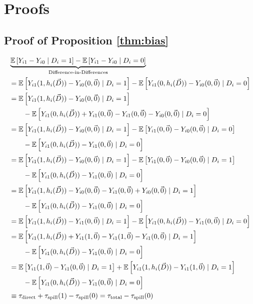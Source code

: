 \documentclass[11pt]{article}
\begin{document}
\section{Proofs}
\label{sec:proofs}

\subsection{Proof of Proposition \ref{thm:bias}}

\begin{align*}
    &\underbrace{\mathbb{E}\left[Y_{i1} - Y_{i0} \mid D_i = 1 \right] - \mathbb{E}\left[Y_{i1} - Y_{i0} \mid D_i = 0 \right]}_{\text{Difference-in-Differences}} \\
    &= \mathbb{E}\left[Y_{i1}(1, h_i(\vec{D})) - Y_{i0}(0, \vec{0})  \mid D_i = 1 \right] - \mathbb{E}\left[Y_{i1}(0, h_i(\vec{D})) - Y_{i0}(0, \vec{0}) \mid D_i = 0 \right] \\
    &= \mathbb{E}\left[Y_{i1}(1, h_i(\vec{D})) - Y_{i0}(0, \vec{0})  \mid D_i = 1 \right] \\
    &\quad\quad - \mathbb{E}\left[Y_{i1}(0, h_i(\vec{D})) + Y_{i1}(0, \vec{0}) - Y_{i1}(0, \vec{0}) - Y_{i0}(0, \vec{0}) \mid D_i = 0 \right] \\
    &= \mathbb{E}\left[Y_{i1}(1, h_i(\vec{D})) - Y_{i0}(0, \vec{0})  \mid D_i = 1 \right] - \mathbb{E}\left[Y_{i1}(0, \vec{0}) - Y_{i0}(0, \vec{0}) \mid D_i = 0\right] \\ 
    &\quad\quad - \mathbb{E}\left[Y_{i1}(0, h_i(\vec{D})) - Y_{i1}(0, \vec{0})\mid D_i = 0\right] \\ 
    &= \mathbb{E}\left[Y_{i1}(1, h_i(\vec{D})) - Y_{i0}(0, \vec{0})  \mid D_i = 1 \right] - \mathbb{E}\left[Y_{i1}(0, \vec{0}) - Y_{i0}(0, \vec{0}) \mid D_i = 1\right] \\
    &\quad\quad - \mathbb{E}\left[Y_{i1}(0, h_i(\vec{D})) - Y_{i1}(0, \vec{0})\mid D_i = 0\right] \\  
    &= \mathbb{E}\left[Y_{i1}(1, h_i(\vec{D})) - Y_{i0}(0, \vec{0}) - Y_{i1}(0, \vec{0}) + Y_{i0}(0, \vec{0})\mid D_i = 1 \right] \\
    &\quad\quad - \mathbb{E}\left[Y_{i1}(0, h_i(\vec{D})) - Y_{i1}(0, \vec{0})\mid D_i = 0\right]\\
    &= \mathbb{E}\left[Y_{i1}(1, h_i(\vec{D})) - Y_{i1}(0, \vec{0}) \mid D_i = 1 \right] - \mathbb{E}\left[Y_{i1}(0, h_i(\vec{D})) - Y_{i1}(0, \vec{0})\mid D_i = 0\right]\\
    &= \mathbb{E}\left[Y_{i1}(1, h_i(\vec{D})) + Y_{i1}(1, \vec{0}) - Y_{i1}(1, \vec{0}) - Y_{i1}(0, \vec{0})\mid D_i = 1 \right] \\
    &\quad\quad - \mathbb{E}\left[Y_{i1}(0, h_i(\vec{D})) - Y_{i1}(0, \vec{0})\mid D_i = 0\right] \\
    &= \mathbb{E}\left[Y_{i1}(1, \vec{0}) - Y_{i1}(0, \vec{0}) \mid D_i = 1\right] + \mathbb{E}\left[Y_{i1}(1, h_i(\vec{D})) - Y_{i1}(1, \vec{0}) \mid D_i = 1\right] \\
    &\quad\quad - \mathbb{E}\left[Y_{i1}(0, h_i(\vec{D})) - Y_{i1}(0, \vec{0}) \mid D_i = 0\right] \\
    &\equiv \tau_{\text{direct}} + \tau_{\text{spill}}(1) - \tau_{\text{spill}}(0) = \tau_{\text{total}} - \tau_{\text{spill}}(0) \\
\end{align*}
\end{document}
